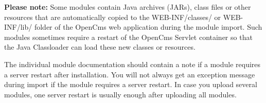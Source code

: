 {\bf Please note:} Some modules contain Java archives (JARs), class files or other resources that are automatically 
copied to the WEB-INF/classes/ or WEB-INF/lib/ folder of the OpenCms web application during the module import. 
Such modules sometimes require a restart of the OpenCms Servlet container so that the Java Classloader can 
load these new classes or resources.

The individual module documentation should contain a note if a module requires a server restart after 
installation. You will not always get an exception message during import if the module requires a server 
restart. In case you upload several modules, one server restart is usually enough after uploading all modules.